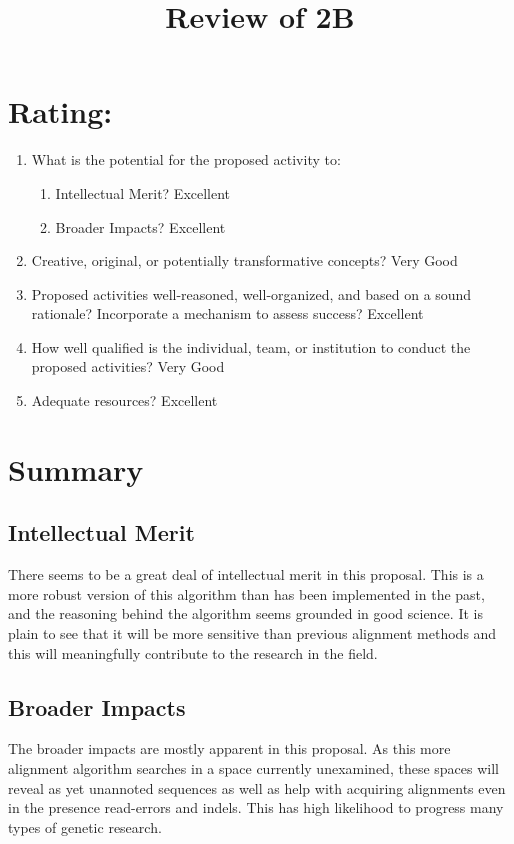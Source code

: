 \documentclass{article}
\title{Review of 2B}
\begin{document}
\maketitle

\section*{Rating:}
\begin{enumerate}
\item What is the potential for the proposed activity to:
  \begin{enumerate}
   \item Intellectual Merit? Excellent
   \item Broader Impacts? Excellent
  \end{enumerate}
\item Creative, original, or potentially transformative concepts? Very Good
\item Proposed activities well-reasoned, well-organized, and based on a sound rationale? Incorporate a mechanism to assess success? Excellent
\item How well qualified is the individual, team, or institution to conduct the proposed activities? Very Good
\item Adequate resources? Excellent
\end{enumerate}

\section*{Summary}
\subsection*{Intellectual Merit}
There seems to be a great deal of intellectual merit in this proposal.  This is a more robust version of this algorithm than has been implemented in the past, and the reasoning behind the algorithm seems grounded in good science.  It is plain to see that it will be more sensitive than previous alignment methods and this will meaningfully contribute to the research in the field.

\subsection*{Broader Impacts}
The broader impacts are mostly apparent in this proposal.  As this more alignment algorithm searches in a space currently unexamined, these spaces will reveal as yet unannoted sequences as well as help with acquiring alignments even in the presence read-errors and indels.  This has high likelihood to progress many types of genetic research.
\end{document}
